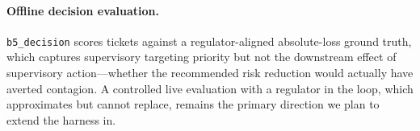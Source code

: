 \paragraph{Offline decision evaluation.}
\texttt{b5\_decision} scores tickets against a regulator-aligned
absolute-loss ground truth, which captures supervisory targeting
priority but not the downstream effect of supervisory action---whether
the recommended risk reduction would actually have averted
contagion. A controlled live evaluation with a regulator in the
loop, which \benchname{} approximates but cannot replace, remains
the primary direction we plan to extend the harness in.
